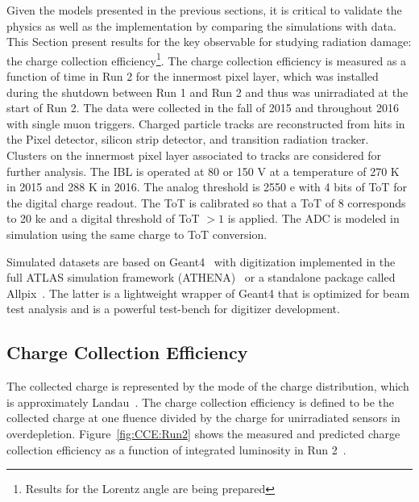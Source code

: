 Given the models presented in the previous sections, it is critical to validate the physics as well as the implementation by comparing the simulations with data.  This Section present results for the  key observable for studying radiation damage: the charge collection efficiency\footnote{Results for the Lorentz angle are being prepared}.  The charge collection efficiency is measured as a function of time in Run 2 for the innermost pixel layer, which was installed during the shutdown between Run 1 and Run 2 and thus was unirradiated at the start of Run 2.  The data were collected in the fall of 2015 and throughout 2016 with single muon triggers.  Charged particle tracks are reconstructed from hits in the Pixel detector, silicon strip detector, and transition radiation tracker.  Clusters on the innermost pixel layer associated to tracks are considered for further analysis.  The IBL is operated at 80 or 150 V at a temperature of 270 K in 2015 and 288 K in 2016.  The analog threshold is 2550 e with 4 bits of ToT for the digital charge readout.  The ToT is calibrated so that a ToT of 8 corresponds to 20 ke and a digital threshold of ToT $>1$ is applied.  The ADC is modeled in simulation using the same charge to ToT conversion.

Simulated datasets are based on Geant4~\cite{Agostinelli:2002hh} with digitization implemented in the full ATLAS simulation framework (ATHENA)~\cite{Aad:2010ah} or a standalone package called Allpix~\cite{benoit:20xx}.  The latter is a lightweight wrapper of Geant4 that is optimized for beam test
 analysis and is a powerful test-bench for digitizer development.


\subsection{Charge Collection Efficiency}
\label{sec:CCE}

The collected charge is represented by the mode of the charge distribution, which is approximately Landau~\cite{Landau:1944if}.  The charge collection efficiency is defined to be the collected charge at one fluence divided by the charge for unirradiated sensors in overdepletion.  Figure~\ref{fig:CCE:Run2} shows the measured and predicted charge collection efficiency as a function of integrated luminosity in Run 2~\cite{Rossini:2273193}. 


